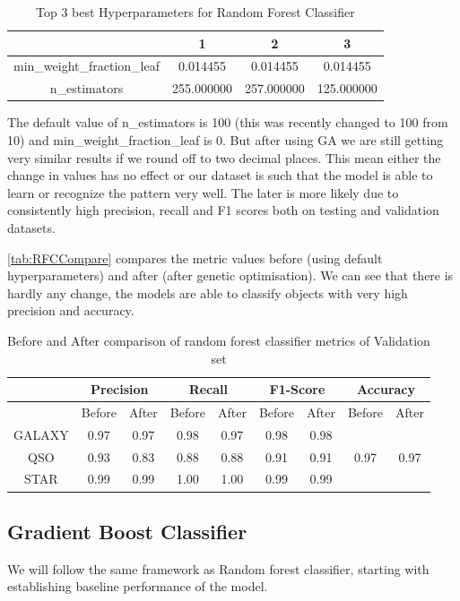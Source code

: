 \begin{table}[H]
\centering
\caption{Top 3 best Hyperparameters for Random Forest Classifier}
\begin{tabular}{|c|c|c|c|}
\hline
& 1 & 2 & 3 \\
\hline
min\_weight\_fraction\_leaf & 0.014455 & 0.014455 & 0.014455 \\
n\_estimators & 255.000000 & 257.000000 & 125.000000 \\
\hline
\end{tabular}
\end{table}
The default value of n\_estimators is 100 (this was recently changed to 100 from 10) and min\_weight\_fraction\_leaf is 0. But after using GA we are still getting very similar results if we round off to two decimal places. This mean either the change in values has no effect or our dataset is such that the model is able to learn or recognize the pattern very well. The later is more likely due to consistently high precision, recall and F1 scores both on testing and validation datasets.

\autoref{tab:RFCCompare} compares the metric values before (using default hyperparameters) and after (after genetic optimisation). We can see that there is hardly any change, the models are able to classify objects with very high precision and accuracy.

\begin{table}[H]
\centering
\caption{Before and After comparison of random forest classifier metrics of Validation set}
\label{tab:RFCCompare}
\begin{tabular}{|c|cc|cc|cc|cc|}
\hline
& \multicolumn{2}{c|}{Precision} & \multicolumn{2}{c|}{Recall} & \multicolumn{2}{c|}{F1-Score} & \multicolumn{2}{c|}{Accuracy}\\
\hline
& Before & After & Before & After & Before & After & Before & After\\
\hline
GALAXY & 0.97 & 0.97 & 0.98 & 0.97 & 0.98 & 0.98 & &\\
QSO    & 0.93 & 0.83 & 0.88 & 0.88 & 0.91 & 0.91 & 0.97 & 0.97\\
STAR   & 0.99 & 0.99 & 1.00 & 1.00 & 0.99 & 0.99 & & \\
\hline
\end{tabular}
\end{table}

\subsection{Gradient Boost Classifier}
We will follow the same framework as Random forest classifier, starting with establishing baseline performance of the model.

